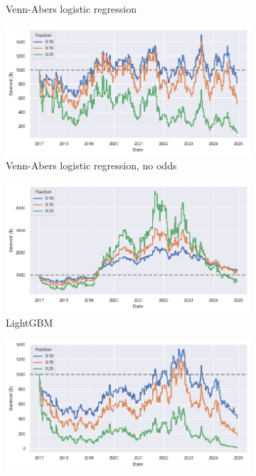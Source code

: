 \documentclass[12pt,twoside]{report}
\begin{document}
\begin{figure}[!htb]
\begin{subfigure}{.5\linewidth}
  \caption{Venn-Abers logistic regression}
\end{subfigure}%
\begin{subfigure}{.5\linewidth}
  \centering
  \includegraphics[width=\linewidth]{figures/bankroll_va_lr_no_odds_simultaneous.png}
  \caption{Venn-Abers logistic regression, no odds}
\end{subfigure}
\begin{subfigure}{.5\linewidth}
  \centering
  \includegraphics[width=\linewidth]{figures/bankroll_lightgbm_simultaneous.png}
  \caption{LightGBM}
\end{subfigure}%
\begin{subfigure}{.5\linewidth}
  \centering
  \includegraphics[width=\linewidth]{figures/bankroll_lightgbm_no_odds_simultaneous.png}

\end{subfigure}
\end{figure}
\end{document}

